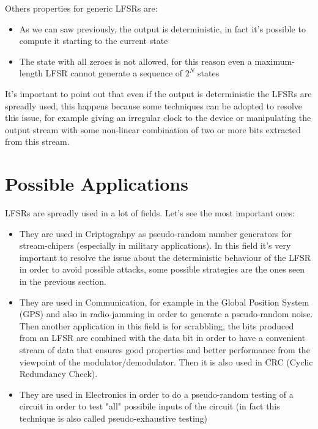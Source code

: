 \documentclass[a4paper]{report}
\begin{document}
\noindent Others properties for generic LFSRs are:
\begin{itemize}
	\item As we can saw previously, the output is deterministic, in fact it's possible to compute it starting to the current state
	\item The state with all zeroes is not allowed, for this reason even a maximum-length LFSR cannot generate a sequence of $2^N$ states
\end{itemize}
It's important to point out that even if the output is deterministic the LFSRs are spreadly used, this happens because some techniques can be adopted to resolve this issue, for example giving an irregular clock to the device or manipulating the output stream with some non-linear combination of two or more bits extracted from this stream.

\section{Possible Applications}
LFSRs are spreadly used in a lot of fields. Let's see the most important ones:
\begin{itemize}
	\item They are used in Criptograhpy as pseudo-random number generators for stream-chipers (especially in military applications). In this field it's very important to resolve the issue about the deterministic behaviour of the LFSR in order to avoid possible attacks, some possible strategies are the ones seen in the previous section.
	\item They are used in Communication, for example in the Global Position System (GPS) and also in radio-jamming in order to generate a pseudo-random noise. Then another application in this field is for scrabbling, the bits produced from an LFSR are combined with the data bit in order to have a convenient stream of data that ensures good properties and better performance from the viewpoint of the modulator/demodulator. Then it is also used in CRC (Cyclic Redundancy Check).
	\item They are used in Electronics in order to do a pseudo-random testing of a circuit in order to test "all" possibile inputs of the circuit (in fact this technique is also called pseudo-exhaustive testing)
\end{itemize}
\end{document}
